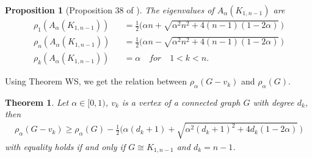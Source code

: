 \documentclass[amsthm]{elsart}
\newtheorem{theorem}{Theorem}[section]
\newtheorem{proposition}{Proposition}[section]
\begin{document}
\begin{proposition} [Proposition 38 of \cite{2016Merging}] \label{prop:1}
The eigenvalues of $A_\alpha(K_{1,n-1})$  are
\begin{eqnarray*}
\rho_1 (A_\alpha(K_{1,n-1})) &&= \frac{1}{2} \big( \alpha n + \sqrt{\alpha ^2 n^2 + 4(n-1)(1-2\alpha)} \, \big)
\\ \rho _n (A_\alpha(K_{1,n-1})) &&= \frac{1}{2} \big( \alpha n - \sqrt{\alpha ^2 n^2 + 4(n-1)(1-2\alpha)} \, \big)
\\ \rho _k (A_\alpha(K_{1,n-1})) &&= \alpha \quad for \quad 1<k<n.
\end{eqnarray*}
\end{proposition}

Using Theorem WS, we get the relation between $\rho _\alpha (G - v_k)$ and $\rho _\alpha (G)$.
\begin{theorem} \label{the:0}
Let $\alpha \in [0, 1)$, $v_k$ is a vertex of a connected graph $G$ with degree $d_k$, then
\begin{eqnarray*}
\rho _\alpha (G - v_k) \geqslant \rho _\alpha (G) - \frac{1}{2} \big( \alpha (d_k + 1) + \sqrt{\alpha ^2 (d_k + 1)^2 + 4 d_k (1-2\alpha)} \, \big)
\end{eqnarray*}
with equality holds if and only if $G \cong K_{1,n-1}$ and $d_k = n - 1$.
\end{theorem}
\end{document}
